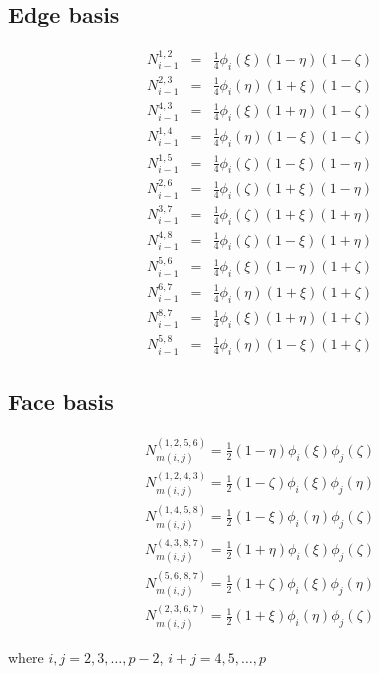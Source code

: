 \subsection{Edge basis}
 
\begin{eqnarray*}
N_{i-1}^{1,2}&=&\frac{1}{4}\phi_i(\xi)(1-\eta)(1-\zeta) \\
N_{i-1}^{2,3}&=&\frac{1}{4}\phi_i(\eta)(1+\xi)(1-\zeta) \\
N_{i-1}^{4,3}&=&\frac{1}{4}\phi_i(\xi)(1+\eta)(1-\zeta) \\
N_{i-1}^{1,4}&=&\frac{1}{4}\phi_i(\eta)(1-\xi)(1-\zeta) \\
N_{i-1}^{1,5}&=&\frac{1}{4}\phi_i(\zeta)(1-\xi)(1-\eta) \\
N_{i-1}^{2,6}&=&\frac{1}{4}\phi_i(\zeta)(1+\xi)(1-\eta) \\
N_{i-1}^{3,7}&=&\frac{1}{4}\phi_i(\zeta)(1+\xi)(1+\eta) \\
N_{i-1}^{4,8}&=&\frac{1}{4}\phi_i(\zeta)(1-\xi)(1+\eta) \\
N_{i-1}^{5,6}&=&\frac{1}{4}\phi_i(\xi)(1-\eta)(1+\zeta) \\
N_{i-1}^{6,7}&=&\frac{1}{4}\phi_i(\eta)(1+\xi)(1+\zeta) \\
N_{i-1}^{8,7}&=&\frac{1}{4}\phi_i(\xi)(1+\eta)(1+\zeta) \\
N_{i-1}^{5,8}&=&\frac{1}{4}\phi_i(\eta)(1-\xi)(1+\zeta)
\end{eqnarray*}

\subsection{Face basis}

\begin{eqnarray*}
N_{m(i,j)}^{(1,2,5,6)}=\frac{1}{2}(1-\eta)\phi_i(\xi)\phi_j(\zeta) \\
N_{m(i,j)}^{(1,2,4,3)}=\frac{1}{2}(1-\zeta)\phi_i(\xi)\phi_j(\eta) \\
N_{m(i,j)}^{(1,4,5,8)}=\frac{1}{2}(1-\xi)\phi_i(\eta)\phi_j(\zeta) \\
N_{m(i,j)}^{(4,3,8,7)}=\frac{1}{2}(1+\eta)\phi_i(\xi)\phi_j(\zeta) \\
N_{m(i,j)}^{(5,6,8,7)}=\frac{1}{2}(1+\zeta)\phi_i(\xi)\phi_j(\eta) \\
N_{m(i,j)}^{(2,3,6,7)}=\frac{1}{2}(1+\xi)\phi_i(\eta)\phi_j(\zeta)
\end{eqnarray*}

\noindent where $i,j=2,3,\ldots,p-2$, $i+j=4,5,\ldots,p$

